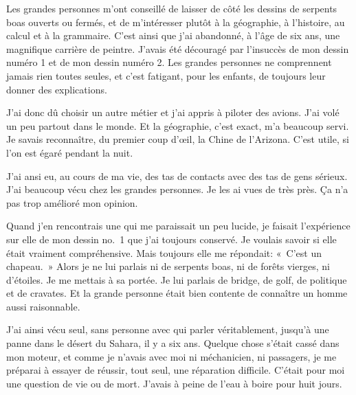 \documentclass{report}
\begin{document}

Les grandes personnes m'ont conseillé de laisser de côté les dessins de serpents boas ouverts ou fermés, et de m'intéresser plutôt à la géographie, à l'histoire, au calcul et à la grammaire. C'est ainsi que j'ai abandonné, à l'âge de six ans, une magnifique carrière de peintre. J'avais été découragé par l'insuccès de mon dessin numéro 1 et de mon dessin numéro 2. Les grandes personnes ne comprennent jamais rien toutes seules, et c'est fatigant, pour les enfants, de toujours leur donner des explications.

J'ai donc dû choisir un autre métier et j'ai appris à piloter des avions. J'ai volé un peu partout dans le monde. Et la géographie, c'est exact, m'a beaucoup servi. Je savais reconnaître, du premier coup d'œil, la Chine de l'Arizona. C'est utile, si l'on est égaré pendant la nuit.

J'ai ansi eu, au cours de ma vie, des tas de contacts avec des tas de gens sérieux.
J'ai beaucoup vécu chez les grandes personnes.
Je les ai vues de très près.
Ça n'a pas trop amélioré mon opinion.

Quand j'en rencontrais une qui me paraissait un peu lucide, je faisait l'expérience sur elle de mon dessin no.~1 que j'ai toujours conservé. Je voulais savoir si elle était vraiment compréhensive. Mais toujours elle me répondait: «~C'est un chapeau.~» Alors je ne lui parlais ni de serpents boas, ni de forêts vierges, ni d'étoiles. Je me mettais à sa portée. Je lui parlais de bridge, de golf, de politique et de cravates. Et la grande personne était bien contente de connaître un homme aussi raisonnable.

\parachapter[II]{} %
J'ai ainsi vécu seul, sans personne avec qui parler véritablement, jusqu'à une panne dans le désert du Sahara, il y a six ans. Quelque chose s'était cassé dans mon moteur, et comme je n'avais avec moi ni méchanicien, ni passagers, je me préparai à essayer de réussir, tout seul, une réparation difficile. C'était pour moi une question de vie ou de mort. J'avais à peine de l'eau à boire pour huit jours.
\end{document}
